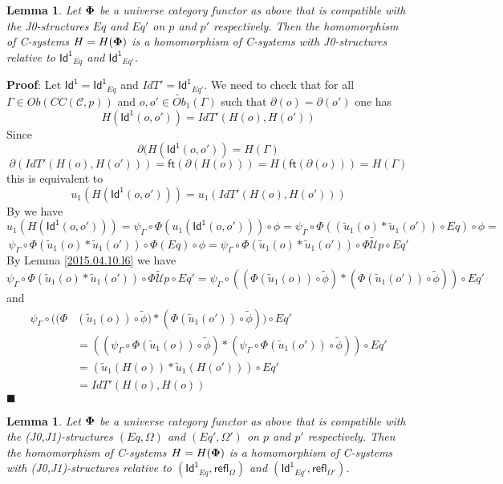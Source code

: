 \documentclass[12pt]{article}
\numberwithin{equation}{section}
\newenvironment{myproof}{{\bf Proof}:}{$\blacksquare$ \vskip 5mm }
\newtheorem{lemma}[proposition]{Lemma}
\newcommand{\llabel}[1]{\label{#1}}
\newcommand{\wt}{\widetilde}
\newcommand{\toCC}{CC} %
\newcommand{\ft}{\mathsf{ft}}
\newcommand{\Id}{\mathsf{Id^1}} %
\newcommand{\refl}{\mathsf{refl}}
\newcommand{\U}{\mathcal{U}}
\begin{document}
\begin{lemma}
\llabel{2015.04.12.l1} Let ${\bf\Phi}$ be a universe category functor as above
that is compatible with the J0-structures $Eq$ and $Eq'$ on $p$ and $p'$
respectively. Then the homomorphism of C-systems $H=H({\bf\Phi})$ is a
homomorphism of C-systems with J0-structures relative to $\Id_{Eq}$ and
$\Id_{Eq'}$.
\end{lemma}
%
\begin{myproof}
Let $\Id=\Id_{Eq}$ and $IdT'=\Id_{Eq'}$. We need to check that for all
$\Gamma\in Ob(\toCC({\mathcal C},p))$ and $o,o'\in \wt{Ob}_1(\Gamma)$ such that
$\partial(o)=\partial(o')$ one has
%
$$H(\Id(o,o'))=IdT'(H(o),H(o'))$$
%
Since
%
$$\partial(H(\Id(o,o'))=H(\Gamma)$$
%
$$\partial(IdT'(H(o),H(o')))=\ft(\partial(H(o)))=H(\ft(\partial(o)))=H(\Gamma)$$
%
this is equivalent to
%
$$u_1(H(\Id(o,o')))=u_1(IdT'(H(o),H(o')))$$
%
By \cite[Lemma 6.1(1)]{fromunivwithPi} we have
%
$$u_1(H(\Id(o,o')))=\psi_{\Gamma}\circ\Phi(u_1(\Id(o,o')))\circ\phi=\psi_{\Gamma}\circ\Phi((\wt{u}_1(o)*\wt{u}_1(o'))\circ
Eq)\circ\phi=$$
%
$$\psi_{\Gamma}\circ\Phi(\wt{u}_1(o)*\wt{u}_1(o'))\circ
\Phi(Eq)\circ\phi=\psi_{\Gamma}\circ\Phi(\wt{u}_1(o)*\wt{u}_1(o'))\circ
\Phi\wt{\U}p\circ Eq'$$
%
By Lemma \ref{2015.04.10.l6} we have
%
$$\psi_{\Gamma}\circ\Phi(\wt{u}_1(o)*\wt{u}_1(o'))\circ \Phi\wt{\U}p\circ
Eq'=\psi_{\Gamma}\circ((\Phi(\wt{u}_1(o))\circ\wt{\phi})*(\Phi(\wt{u}_1(o'))\circ\wt{\phi}))\circ
Eq'$$
%
and \cite[Lemma 6.1(2)]{fromunivwithPi}
%
\begin{align*}
  \psi_{\Gamma}\circ((\Phi&(\wt{u}_1(o))\circ\wt{\phi})*(\Phi(\wt{u}_1(o'))\circ\wt{\phi}))\circ Eq' \\
    & = ((\psi_{\Gamma}\circ\Phi(\wt{u}_1(o))\circ\wt{\phi})*(\psi_{\Gamma}\circ\Phi(\wt{u}_1(o'))\circ\wt{\phi}))\circ Eq' \\
    & = (\wt{u}_1(H(o))*\wt{u}_1(H(o')))\circ Eq' \\
    & = IdT'(H(o),H(o))
\end{align*}
\end{myproof}
%
\begin{lemma}
\llabel{2015.04.12.l2} Let ${\bf\Phi}$ be a universe category functor as above
that is compatible with the (J0,J1)-structures $(Eq,\Omega)$ and
$(Eq',\Omega')$ on $p$ and $p'$ respectively. Then the homomorphism of
C-systems $H=H({\bf\Phi})$ is a homomorphism of C-systems with
(J0,J1)-structures relative to $(\Id_{Eq},\refl_{\Omega})$ and
$(\Id_{Eq'},\refl_{\Omega'})$.
\end{lemma}
%
\end{document}
